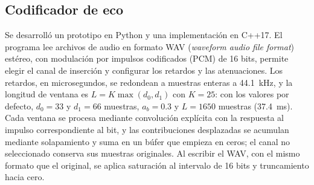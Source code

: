 \subsection{Codificador de eco}
\label{sec:codificador}

Se desarrolló un prototipo en Python y una implementación en C++17.
El programa lee archivos de audio en formato WAV (\textit{waveform audio file format}) estéreo, con modulación por impulsos codificados (PCM) de 16 bits, permite elegir el canal de
inserción y configurar los retardos y las atenuaciones. Los retardos, en
microsegundos, se redondean a muestras enteras a \SI{44.1}{\kilo\hertz}, y la
longitud de ventana es $L=K\max(d_0,d_1)$ con $K=25$: con los valores por
defecto, $d_0=33$ y $d_1=66$ muestras, $a_b=0.3$ y $L=1650$ muestras
(\SI{37.4}{\milli\second}). Cada ventana se procesa mediante convolución
explícita con la respuesta al impulso correspondiente al bit, y las
contribuciones desplazadas se acumulan mediante solapamiento y suma en un búfer
que empieza en ceros; el canal no seleccionado conserva sus muestras originales.
Al escribir el WAV, con el mismo formato que el original, se aplica saturación
al intervalo de 16 bits y truncamiento hacia cero.
